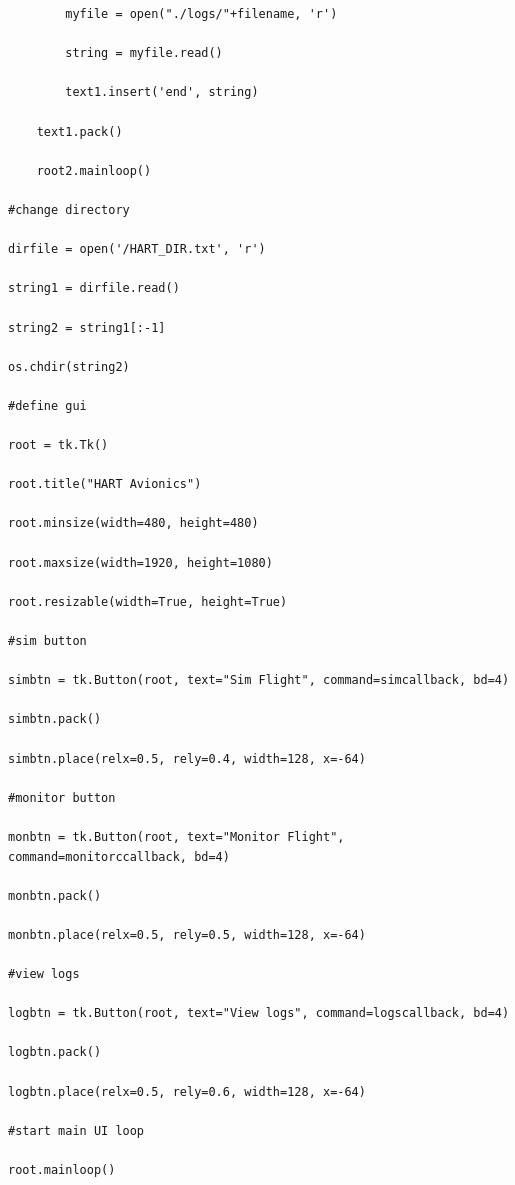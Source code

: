 \documentclass[onecolumn, draftclsnofoot,10pt, compsoc]{IEEEtran}
\begin{document}
\begin{lstlisting}
		myfile = open("./logs/"+filename, 'r')

		string = myfile.read()

		text1.insert('end', string)

	text1.pack()

	root2.mainloop()

#change directory

dirfile = open('/HART_DIR.txt', 'r')

string1 = dirfile.read()

string2 = string1[:-1]

os.chdir(string2)

#define gui

root = tk.Tk()

root.title("HART Avionics")

root.minsize(width=480, height=480)

root.maxsize(width=1920, height=1080)

root.resizable(width=True, height=True)

#sim button

simbtn = tk.Button(root, text="Sim Flight", command=simcallback, bd=4)

simbtn.pack()

simbtn.place(relx=0.5, rely=0.4, width=128, x=-64)

#monitor button

monbtn = tk.Button(root, text="Monitor Flight", command=monitorccallback, bd=4)

monbtn.pack()

monbtn.place(relx=0.5, rely=0.5, width=128, x=-64)

#view logs

logbtn = tk.Button(root, text="View logs", command=logscallback, bd=4)

logbtn.pack()

logbtn.place(relx=0.5, rely=0.6, width=128, x=-64)

#start main UI loop

root.mainloop()
\end{lstlisting}
\end{document}
